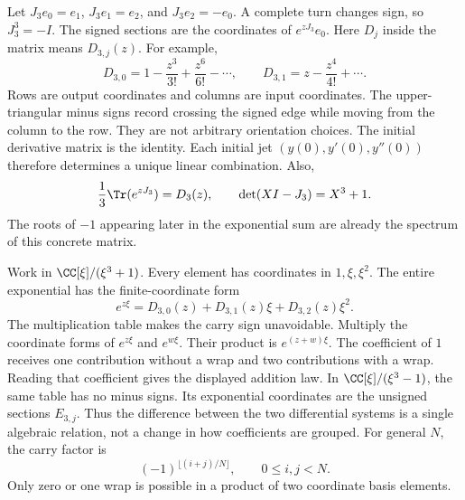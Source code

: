 Let $J_3e_0=e_1$, $J_3e_1=e_2$, and $J_3e_2=-e_0$. A complete turn changes sign, so $J_3^3=-I$. The signed sections are the coordinates of $e^{zJ_3}e_0$.
Here $D_j$ inside the matrix means $D_{3,j}(z)$. For example,
\[
D_{3,0}=1-\frac{z^3}{3!}+\frac{z^6}{6!}-\cdots,
\qquad D_{3,1}=z-\frac{z^4}{4!}+\cdots.
\]
Rows are output coordinates and columns are input coordinates. The upper-triangular minus signs record crossing the signed edge while moving from the column to the row. They are not arbitrary orientation choices.
The initial derivative matrix is the identity. Each initial jet $(y(0),y'(0),y''(0))$ therefore determines a unique linear combination. Also,
\[
\frac13\Tr(e^{zJ_3})=D_3(z),\qquad \det(XI-J_3)=X^3+1.
\]
The roots of $-1$ appearing later in the exponential sum are already the spectrum of this concrete matrix.

Work in $\CC[\xi]/(\xi^3+1)$. Every element has coordinates in $1,\xi,\xi^2$. The entire exponential has the finite-coordinate form
\[
e^{z\xi}=D_{3,0}(z)+D_{3,1}(z)\xi+D_{3,2}(z)\xi^2.
\]
The multiplication table makes the carry sign unavoidable.
Multiply the coordinate forms of $e^{z\xi}$ and $e^{w\xi}$. Their product is $e^{(z+w)\xi}$. The coefficient of $1$ receives one contribution without a wrap and two contributions with a wrap. Reading that coefficient gives the displayed addition law.
In $\CC[\xi]/(\xi^3-1)$, the same table has no minus signs. Its exponential coordinates are the unsigned sections $E_{3,j}$. Thus the difference between the two differential systems is a single algebraic relation, not a change in how coefficients are grouped.
For general $N$, the carry factor is
\[
(-1)^{\lfloor(i+j)/N\rfloor},\qquad 0\le i,j<N.
\]
Only zero or one wrap is possible in a product of two coordinate basis elements.

